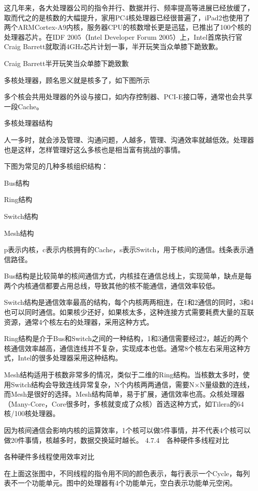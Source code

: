 \documentclass[12pt,UTF8]{ctexbook}
\begin{document}
这几年来，各大处理器公司的指令并行、数据并行、频率提高等进展已经放缓了，取而代之的是核数的大幅提升，家用PC4核处理器已经很普遍了，iPad2也使用了两个ARMCortex-A9内核，服务器CPU的核数增长更是迅猛，已推出了100个核的处理器芯片。在IDF 2005（Intel Developer Forum 2005）上，Intel首席执行官Craig Barrett就取消4GHz芯片计划一事，半开玩笑当众单膝下跪致歉。

Craig Barrett半开玩笑当众单膝下跪致歉

多核处理器，顾名思义就是核多了，如下图所示

多个核会共用处理器的外设与接口，如内存控制器、PCI-E接口等，通常也会共享一段Cache。

多核处理器结构

人一多时，就会涉及管理、沟通问题，人越多，管理、沟通效率就越低效。处理器也是这样，怎样管理好这么多核也是相当富有挑战的事情。

下图为常见的几种多核组织结构：

Bus结构

Ring结构

Switch结构

Mesh结构

p表示内核，c表示内核拥有的Cache，s表示Switch，用于核间的通信。线条表示通信路径。

Bus结构是比较简单的核间通信方式，内核挂在通信总线上，实现简单，缺点是每两个内核通信都要占用总线，导致其他的核不能通信，通信效率较低。

Switch结构是通信效率最高的结构，每个内核两两相连，在1和2通信的同时，3和4也可以同时通信。如果核少还好，如果核太多，这种连接方式需要耗费大量的互联资源，通常4个核左右的处理器，采用这种方式。

Ring结构是介于Bus和Switch之间的一种结构，1和3通信需要经过2，越近的两个核通信效率越高，通信连线并不复杂，实现成本也低。通常8个核左右采用这种方式，Intel的很多处理器采用这种结构。

Mesh结构适用于核数非常多的情况，类似于二维的Ring结构。当核数太多时，使用Switch结构会导致连线异常复杂，N个内核两两通信，需要N×N量级数的连线，而Mesh是很好的选择。Mesh结构简单，易于扩展，通信效率也高。众核处理器（Many-Core，Core很多时，多核就变成了众核）首选这种方式，如Tilera的64核/100核处理器。

因为核间通信会影响内核的运算效率，1个核可以做5件事情，并不代表4个核可以做20件事情，核越多时，数据交换延时越长。
4.7.4　各种硬件多线程对比

各种硬件多线程使用效率对比

在上面这张图中，不同线程的指令用不同的颜色表示，每行表示一个Cycle，每列表不一个功能单元。图中的处理器有4个功能单元，空白表示功能单元空闲。
\end{document}
